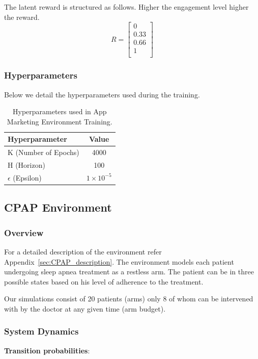 \documentclass{article} %
\begin{document}
{The latent reward is structured as follows. Higher the engagement level higher the reward.
\[
R = \begin{bmatrix}
0 \\
0.33 \\
0.66 \\
1 \\
\end{bmatrix}
\]
\subsubsection{Hyperparameters}
Below we detail the hyperparameters used during the training.

\begin{table}[h!]
\centering
\begin{tabular}{|l|c|}
\hline
\textbf{Hyperparameter} & \textbf{Value} \\ \hline
K (Number of Epochs) & 4000 \\ \hline
H (Horizon) & 100 \\ \hline
$\epsilon$ (Epsilon) & $1 \times 10^{-5}$ \\ \hline
\end{tabular}
\caption{Hyperparameters used in App Marketing Environment Training.}
\label{tab:hyperparameters_cpap}
\end{table}

\subsection{CPAP Environment}\label{sec:CPAP_appendix}
\subsubsection{Overview}
For a detailed description of the environment refer Appendix~\ref{sec:CPAP_description}. The environment models each patient undergoing sleep apnea treatment as a restless arm. The patient can be in three possible states based on his level of adherence to the treatment.

Our simulations consist of 20 patients (arms) only 8 of whom can be intervened with by the doctor at any given time (arm budget).


\subsubsection{System Dynamics}

\textbf{Transition probabilities}:

}
\end{document}
